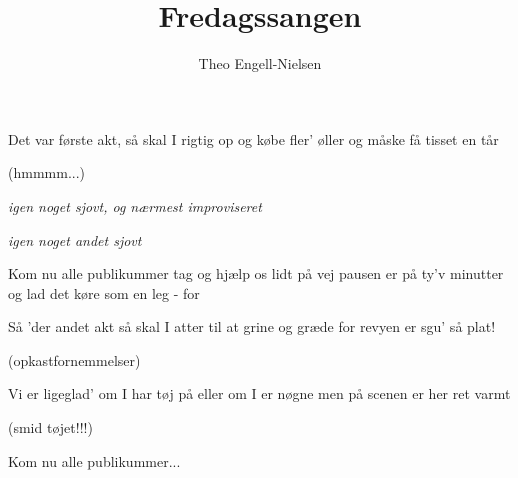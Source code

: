 \documentclass[11pt]{article}
\title{Fredagssangen}
\author{Theo Engell-Nielsen}
\begin{document}
\maketitle

\begin{sketch}
\end{sketch}

\begin{song}

 Det var første akt,
        så skal I rigtig op og købe fler' øller
        og måske få tisset en tår

(hmmmm...)

 \em{igen noget sjovt, og nærmest improviseret}

  \em{igen noget andet sjovt}

  Kom nu alle publikummer
        tag og hjælp os lidt på vej
        pausen er på ty'v minutter
        og lad det køre som en leg - for

        Så 'der andet akt
        så skal I atter til at grine og græde
        for revyen er sgu' så plat!

(opkastfornemmelser)

 Vi er ligeglad'
        om I har tøj på eller om I er nøgne
        men på scenen er her ret varmt 

 (smid tøjet!!!)
        
 Kom nu alle publikummer...


\end{song}
\end{document}
